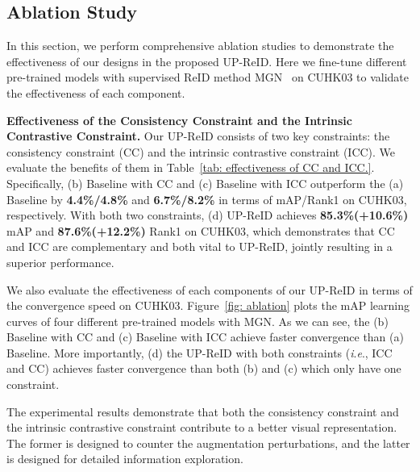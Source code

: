 \documentclass[10pt,twocolumn,letterpaper]{article}
\newcommand{\ieno}{\textit{i}.\textit{e}.}
\begin{document}
\subsection{Ablation Study}
In this section, we perform comprehensive ablation studies to demonstrate the effectiveness of our designs in the proposed UP-ReID. Here we fine-tune different pre-trained models with supervised ReID method MGN~\cite{wang2018learning} on CUHK03 to validate the effectiveness of each component. 

\noindent\textbf{Effectiveness of the Consistency Constraint and the Intrinsic Contrastive Constraint.}
Our UP-ReID consists of two key constraints: the consistency constraint (CC) and the intrinsic contrastive constraint (ICC). We evaluate the benefits of them in Table~\ref{tab: effectiveness of CC and ICC.}. Specifically, (b) Baseline with CC and (c) Baseline with ICC outperform the (a) Baseline by \textbf{4.4\%/4.8\%} and \textbf{6.7\%/8.2\%} in terms of mAP/Rank1 on CUHK03, respectively. With both two constraints, (d) UP-ReID achieves \textbf{85.3\%(+10.6\%)} mAP and \textbf{87.6\%(+12.2\%)} Rank1 on CUHK03, which demonstrates that CC and ICC are complementary and both vital to UP-ReID, jointly resulting in a superior performance.

We also evaluate the effectiveness of each components of our UP-ReID in terms of the convergence speed on CUHK03.
Figure~\ref{fig: ablation} plots the mAP learning curves of four different pre-trained models with MGN. As we can see, the (b) Baseline with CC and (c) Baseline with ICC achieve faster convergence than (a) Baseline. More importantly, (d) the UP-ReID with both constraints (\ieno, ICC and CC) achieves faster convergence than both (b) and (c) which only have one constraint.



The experimental results demonstrate that both the consistency constraint and the intrinsic contrastive constraint contribute to a better visual representation. The former is designed to counter the augmentation perturbations, and the latter is designed for detailed information exploration.
\end{document}
